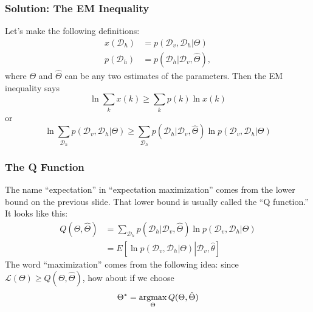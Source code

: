 \documentclass{beamer}
\newcommand{\argmax}{\operatornamewithlimits{argmax}}
\begin{document}
\begin{frame}
  \frametitle{Solution: The EM Inequality}

  Let's make the following definitions:
  \begin{align*}
    x({\mathcal D}_h)  &= p({\mathcal D}_v,{\mathcal D}_h|\Theta)\\
    p({\mathcal D}_h)  &= p({\mathcal D}_h|{\mathcal D}_v,\hat\Theta),
  \end{align*}
  where $\Theta$ and $\hat\Theta$ can be any two estimates of
  the parameters.  Then the EM inequality says
  \begin{displaymath}
    \ln\sum_k x(k) \ge \sum_k p(k)\ln x(k)
  \end{displaymath}
  or 
  \begin{displaymath}
    \ln\sum_{{\mathcal D}_h}p({\mathcal D}_v,{\mathcal D}_h|\Theta)
    \ge
    \sum_{{\mathcal D}_h} p({\mathcal D}_h|{\mathcal D}_v,\hat\Theta)
    \ln p({\mathcal D}_v,{\mathcal D}_h|\Theta)
  \end{displaymath}
\end{frame}

\begin{frame}
  \frametitle{The Q Function}

  The name ``expectation'' in ``expectation maximization'' comes from
  the lower bound on the previous slide.  That lower bound is usually
  called the ``Q function.''  It looks like this:
  \begin{align*}
    Q(\Theta,\hat\Theta) &=
    \sum_{{\mathcal D}_h} p({\mathcal D}_h|{\mathcal D}_v,\hat\Theta)
    \ln p({\mathcal D}_v,{\mathcal D}_h|\Theta)\\
    &= E\left[\ln p({\mathcal D}_v,{\mathcal D}_h|\Theta)\left|{\mathcal D}_v,\hat\theta\right.\right]
  \end{align*}
  The word ``maximization'' comes from the following idea:
  since ${\mathcal L}(\Theta)\ge Q(\Theta,\hat\Theta)$,
  how about if we choose
  \[
  \Theta^* = \argmax_\Theta Q(\Theta,\hat\Theta)
  \]
\end{frame}
\end{document}
